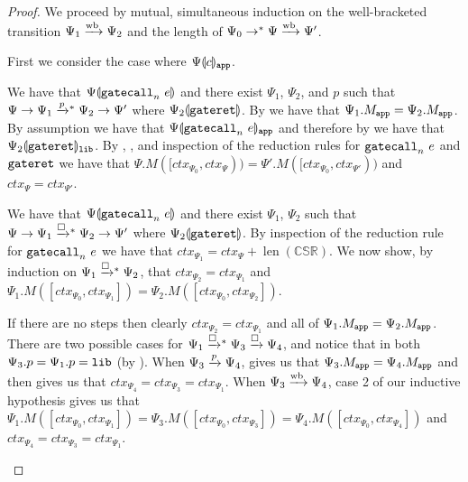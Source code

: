\begin{proof}
  We proceed by mutual, simultaneous induction on the well-bracketed transition $\Psi_1 \mathrel{\xrightarrow{\!\text{wb}}} \Psi_2$ and the length of $\Psi_0 \mathrel{\mathrel{\rightarrow}^{\ast}} \Psi \mathrel{\xrightarrow{\!\text{wb}}} \Psi'$.

  First we consider the case where ${\Psi}\llparenthesis{c}\rrparenthesis_{\mathtt{app}}$.
  \begin{itemize}

    We have that ${\Psi}\llparenthesis{\ensuremath{\mathtt{gatecall}_{n}\ {e}}}\rrparenthesis$ and there exist $\Psi_1$, $\Psi_2$, and $p$ such that $\Psi \step \Psi_1 \steppstar{p} \Psi_2 \step \Psi'$ where ${\Psi_2}\llparenthesis{\ensuremath{\mathtt{gateret}}}\rrparenthesis$.
    By  we have that $\Psi_1.M_{\mathtt{app}} = \Psi_2.M_{\mathtt{app}}$.
    By assumption we have that ${\Psi}\llparenthesis{\ensuremath{\mathtt{gatecall}_{n}\ {e}}}\rrparenthesis_{\mathtt{app}}$ and therefore by  we have that ${\Psi_2}\llparenthesis{\ensuremath{\mathtt{gateret}}}\rrparenthesis_{\mathtt{lib}}$.
    By , , and inspection of the reduction rules for $\mathtt{gatecall}_{n}\ {e}$ and $\mathtt{gateret}$ we have that $\Psi.M([ctx_{\Psi_0}, ctx_{\Psi})) = \Psi'.M([ctx_{\Psi_0}, ctx_{\Psi'}))$ and $ctx_{\Psi} = ctx_{\Psi'}$.


    We have that ${\Psi}\llparenthesis{\ensuremath{\mathtt{gatecall}_{n}\ {e}}}\rrparenthesis$ and there exist $\Psi_1$, $\Psi_2$  such that $\Psi \step \Psi_1 \stepboxstar \Psi_2 \step \Psi'$ where ${\Psi_2}\llparenthesis{\ensuremath{\mathtt{gateret}}}\rrparenthesis$.
    By inspection of the reduction rule for $\mathtt{gatecall}_{n}\ {e}$ we have that $ctx_{\Psi_1} = ctx_{\Psi} + \operatorname{len}(\mathbb{CSR})$.
    We now show, by induction on $\Psi_1 \stepboxstar \Psi_2$, that $ctx_{\Psi_2} = ctx_{\Psi_1}$ and $\Psi_1.M([ctx_{\Psi_0}, ctx_{\Psi_1}]) = \Psi_2.M([ctx_{\Psi_0}, ctx_{\Psi_2}])$.

    \begin{subproof}
      If there are no steps then clearly $ctx_{\Psi_2} = ctx_{\Psi_1}$ and all of $\Psi_1.M_{\mathtt{app}} = \Psi_2.M_{\mathtt{app}}$.
      There are two possible cases for $\Psi_1 \stepboxstar \Psi_3 \stepbox \Psi_4$, and notice that in both $\Psi_3.p = \Psi_1.p = \mathtt{lib}$ (by ).
      When $\Psi_3 \mathrel{\xrightarrow{p}} \Psi_4$,  gives us that $\Psi_3.M_{\mathtt{app}} = \Psi_4.M_{\mathtt{app}}$ and then  gives us that $ctx_{\Psi_4} = ctx_{\Psi_3} = ctx_{\Psi_1}$.
      When $\Psi_3 \mathrel{\xrightarrow{\!\text{wb}}} \Psi_4$, case 2 of our inductive hypothesis gives us that $\Psi_1.M([ctx_{\Psi_0}, ctx_{\Psi_1}]) = \Psi_3.M([ctx_{\Psi_0}, ctx_{\Psi_3}]) = \Psi_4.M([ctx_{\Psi_0}, ctx_{\Psi_4}])$ and $ctx_{\Psi_4} = ctx_{\Psi_3} = ctx_{\Psi_1}$.
    \end{subproof}


\end{itemize}
\end{proof}
